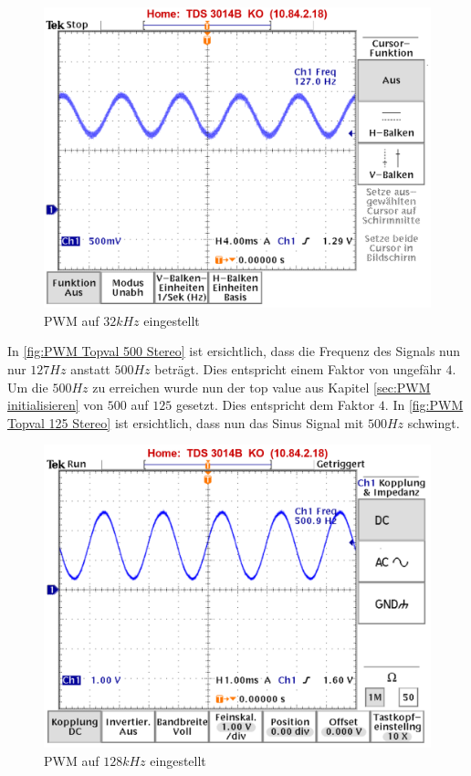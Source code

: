 \begin{figure}[htbp]
\centering
\includegraphics[scale=1.0]{data/TOPVAL_Stereo_500.png}
\caption{PWM auf $32kHz$ eingestellt}
\label{fig:PWM Topval 500 Stereo}
\end{figure}

In \autoref{fig:PWM Topval 500 Stereo} ist ersichtlich, dass die Frequenz des Signals nun nur $127Hz$ anstatt $500Hz$ beträgt. Dies entspricht einem Faktor von ungefähr $4$. Um die $500Hz$ zu erreichen wurde nun der top value aus Kapitel \ref{sec:PWM initialisieren} von $500$ auf $125$ gesetzt. Dies entspricht dem Faktor $4$. In \autoref{fig:PWM Topval 125 Stereo} ist ersichtlich, dass nun das Sinus Signal mit $500Hz$ schwingt.
\newpage

\begin{figure}[htbp!]
\centering
\includegraphics[scale=1.0]{data/TOPVAL_Stereo_125.png}
\caption{PWM auf $128kHz$ eingestellt}
\label{fig:PWM Topval 125 Stereo}
\end{figure}

